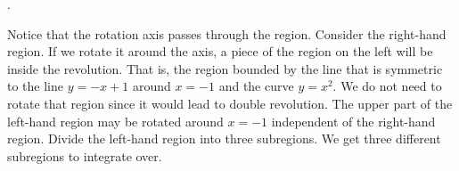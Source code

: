 \documentclass{article}
\begin{document}
\hfill

.
\begin{center}
\end{center}

\noindent Notice that the rotation axis passes through the region. Consider the right-hand region. If we rotate it around the axis, a piece of the region on the left will be inside the revolution. That is, the region bounded by the line that is symmetric to the line $y=-x+1$ around $x=-1$ and the curve $y=x^2$. We do not need to rotate that region since it would lead to double revolution. The upper part of the left-hand region may be rotated around $x=-1$ independent of the right-hand region. Divide the left-hand region into three subregions. We get three different subregions to integrate over.
\end{document}

